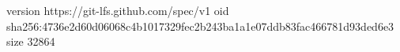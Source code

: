 version https://git-lfs.github.com/spec/v1
oid sha256:4736e2d60d06068c4b1017329fec2b243ba1a1e07ddb83fac466781d93ded6e3
size 32864
